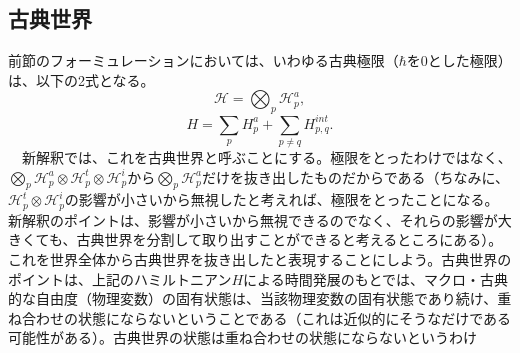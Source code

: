 \subsection{古典世界}
前節のフォーミュレーションにおいては、いわゆる古典極限（$\hbar$を$0$とした極限）は、以下の2式となる。
\begin{equation}
    \mathcal{H} = \bigotimes_p \mathcal{H}_p^a,
\end{equation}
\begin{equation}
H=\sum_pH_p^a+ \sum_{p \neq q} H^{int}_{p,q}.
\end{equation}
　新解釈では、これを古典世界と呼ぶことにする。極限をとったわけではなく、$\bigotimes_p \mathcal{H}_p^a \otimes  \mathcal{H}_p^t \otimes  \mathcal{H}_p^i$から$\bigotimes_p \mathcal{H}_p^a$だけを抜き出したものだからである（ちなみに、$\mathcal{H}_p^t \otimes  \mathcal{H}_p^i$の影響が小さいから無視したと考えれば、極限をとったことになる。新解釈のポイントは、影響が小さいから無視できるのでなく、それらの影響が大きくても、古典世界を分割して取り出すことができると考えるところにある）。これを世界全体から古典世界を抜き出したと表現することにしよう。古典世界のポイントは、上記のハミルトニアン$H$による時間発展のもとでは、マクロ・古典的な自由度（物理変数）の固有状態は、当該物理変数の固有状態であり続け、重ね合わせの状態にならないということである（これは近似的にそうなだけである可能性がある）。古典世界の状態は重ね合わせの状態にならないというわけ
